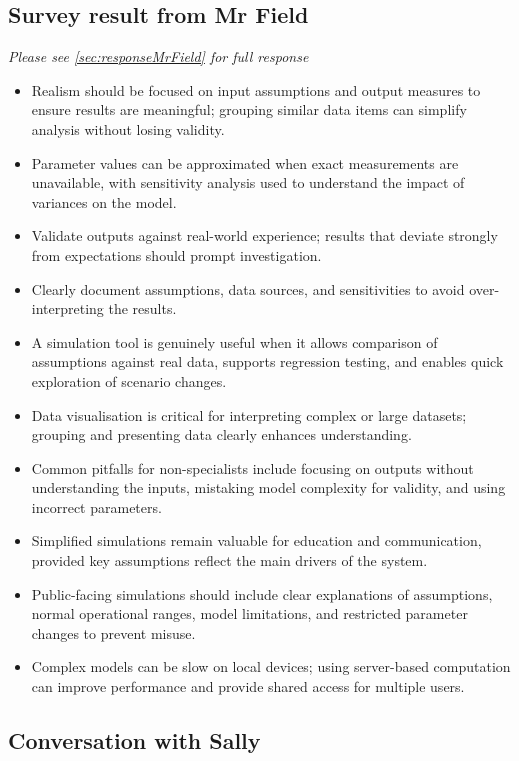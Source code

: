 \subsection{Survey result from Mr Field}
\textit{Please see \autoref{sec:responseMrField} for full response}
\begin{itemize}
  \item Realism should be focused on input assumptions and output measures to ensure results are meaningful; grouping similar data items can simplify analysis without losing validity.
  \item Parameter values can be approximated when exact measurements are unavailable, with sensitivity analysis used to understand the impact of variances on the model.
  \item Validate outputs against real-world experience; results that deviate strongly from expectations should prompt investigation.
  \item Clearly document assumptions, data sources, and sensitivities to avoid over-interpreting the results.
  \item A simulation tool is genuinely useful when it allows comparison of assumptions against real data, supports regression testing, and enables quick exploration of scenario changes.
  \item Data visualisation is critical for interpreting complex or large datasets; grouping and presenting data clearly enhances understanding.
  \item Common pitfalls for non-specialists include focusing on outputs without understanding the inputs, mistaking model complexity for validity, and using incorrect parameters.
  \item Simplified simulations remain valuable for education and communication, provided key assumptions reflect the main drivers of the system.
  \item Public-facing simulations should include clear explanations of assumptions, normal operational ranges, model limitations, and restricted parameter changes to prevent misuse.
  \item Complex models can be slow on local devices; using server-based computation can improve performance and provide shared access for multiple users.
\end{itemize}
\subsection{Conversation with Sally}

